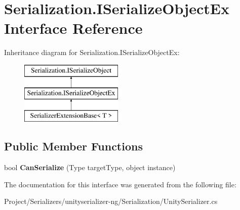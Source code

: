 \hypertarget{interface_serialization_1_1_i_serialize_object_ex}{}\section{Serialization.\+I\+Serialize\+Object\+Ex Interface Reference}
\label{interface_serialization_1_1_i_serialize_object_ex}
Inheritance diagram for Serialization.\+I\+Serialize\+Object\+Ex\+:\begin{figure}[H]
\begin{center}
\leavevmode
\includegraphics[height=3.000000cm]{interface_serialization_1_1_i_serialize_object_ex}
\end{center}
\end{figure}
\subsection*{Public Member Functions}
\begin{DoxyCompactItemize}
\item 
\mbox{\label{interface_serialization_1_1_i_serialize_object_ex_a5a13bf50bde25dc6b1f593da8cb5eb06}} 
bool {\bfseries Can\+Serialize} (Type target\+Type, object instance)
\end{DoxyCompactItemize}


The documentation for this interface was generated from the following file\+:\begin{DoxyCompactItemize}
\item 
Project/\+Serializers/unityserializer-\/ng/\+Serialization/Unity\+Serializer.\+cs\end{DoxyCompactItemize}

